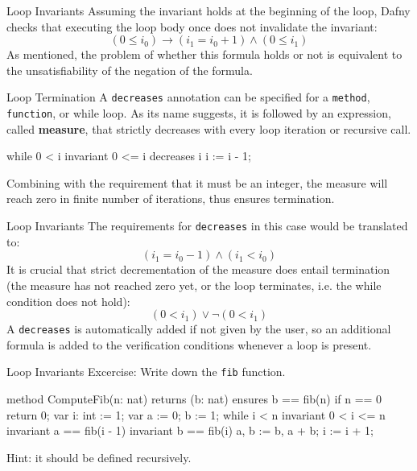 \documentclass[10pt, compress]{beamer}
\begin{document}
\begin{frame}[fragile]{Loop Invariants}
Assuming the invariant holds at the beginning of the loop, Dafny checks that executing the loop body once does not invalidate the invariant:
    $$(0 \leq i_0) \to (i_1 = i_0 + 1) \land (0 \leq i_1)$$
As mentioned, the problem of whether this formula holds or not is equivalent to the unsatisfiability of the negation of the formula.

\end{frame}

\begin{frame}[fragile]{Loop Termination}
  A \verb|decreases| annotation can be specified for a \verb|method|, \verb|function|, or while loop. As its name suggests, it is followed by an expression, called \textbf{measure}, that strictly decreases with every loop iteration or recursive call.
  \begin{verbnobox}[\footnotesize]
while 0 < i
   invariant 0 <= i
   decreases i
{
   i := i - 1;
}
  \end{verbnobox}
Combining with the requirement that it must be an integer, the measure will reach zero in finite number of iterations, thus ensures termination.
\end{frame}

\begin{frame}[fragile]{Loop Invariants}
The requirements for \verb|decreases| in this case would be translated to:
  $$(i_1 = i_0 - 1) \land (i_1 < i_0)$$
It is crucial that strict decrementation of the measure does entail termination (the measure has not reached zero yet, or the loop terminates, i.e. the while condition does not hold):
  $$(0 < i_1) \lor \neg(0 < i_1) $$
A \verb|decreases| is automatically added if not given by the user, so an additional formula is added to the verification conditions whenever a loop is present.
\end{frame}

\begin{frame}[fragile]{Loop Invariants}
  Excercise: Write down the \verb|fib| function.
  \begin{verbnobox}[\footnotesize]
method ComputeFib(n: nat) returns (b: nat)
   ensures b == fib(n)
{
   if n == 0 { return 0; }
   var i: int := 1;
   var a := 0;
       b := 1;
   while i < n
      invariant 0 < i <= n
      invariant a == fib(i - 1)
      invariant b == fib(i)
   {
      a, b := b, a + b;
      i := i + 1;
   }
}
  \end{verbnobox}
  Hint: it should be defined recursively.
\end{frame}
\end{document}
